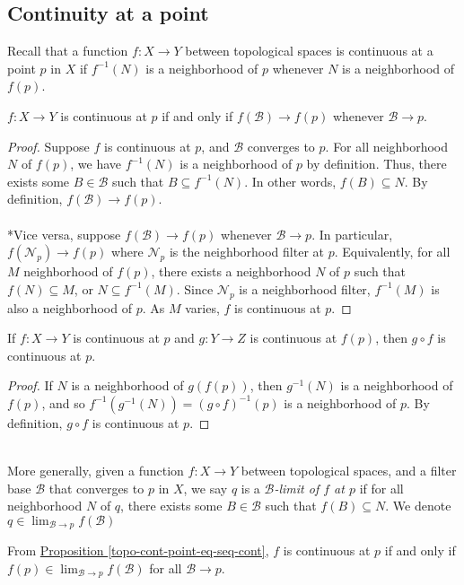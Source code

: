 \documentclass{treatise}
\begin{document}
\subsection{Continuity at a point}
Recall that a function $f: X \to Y$ between topological spaces is continuous at a point $p$ in $X$ if $f^{-1}(N)$ is a neighborhood of $p$ whenever $N$ is a neighborhood of $f(p)$.
\begin{proposition} \label{topo-cont-point-eq-seq-cont}
$f: X \to Y$ is continuous at $p$ if and only if $f(\mathcal{B}) \to f(p)$ whenever $\mathcal{B} \to p$.
\end{proposition}
\begin{proof}
Suppose $f$ is continuous at $p$, and $\mathcal{B}$ converges to $p$. For all neighborhood $N$ of $f(p)$, we have $f^{-1}(N)$ is a neighborhood of $p$ by definition. Thus, there exists some $B \in \mathcal{B}$ such that $B \subseteq f^{-1}(N)$. In other words, $f(B) \subseteq N$. By definition, $f(\mathcal{B}) \to f(p)$.
\\
\\
*Vice versa, suppose $f(\mathcal{B}) \to f(p)$ whenever $\mathcal{B} \to p$. In particular, $f(\mathcal{N}_p) \to f(p)$ where $\mathcal{N}_p$ is the neighborhood filter at $p$. Equivalently, for all $M$ neighborhood of $f(p)$, there exists a neighborhood $N$ of $p$ such that $f(N) \subseteq M$, or $N \subseteq f^{-1}(M)$. Since $\mathcal{N}_p$ is a neighborhood filter, $f^{-1}(M)$ is also a neighborhood of $p$. As $M$ varies, $f$ is continuous at $p$.
\end{proof}
\begin{proposition}
If $f: X \to Y$ is continuous at $p$ and $g: Y \to Z$ is continuous at $f(p)$, then $g \circ f$ is continuous at $p$.
\end{proposition}
\begin{proof}
If $N$ is a neighborhood of $g(f(p))$, then $g^{-1}(N)$ is a neighborhood of $f(p)$, and so $f^{-1}(g^{-1}(N)) = (g \circ f)^{-1}(p)$ is a neighborhood of $p$. By definition, $g \circ f$ is continuous at $p$.
\end{proof}
\ \\
More generally, given a function $f: X \to Y$ between topological spaces, and a filter base $\mathcal{B}$ that converges to $p$ in $X$, we say $q$ is a \emph{$\mathcal{B}$-limit of $f$ at $p$} if for all neighborhood $N$ of $q$, there exists some $B \in \mathcal{B}$ such that $f(B) \subseteq N$. We denote $q \in \lim_{\mathcal{B} \to p} f(\mathcal{B})$
\begin{remark}
From \hyperref[topo-cont-point-eq-seq-cont]{Proposition \ref*{topo-cont-point-eq-seq-cont}}, $f$ is continuous at $p$ if and only if $f(p) \in \lim_{\mathcal{B} \to p} f(\mathcal{B})$ for all $\mathcal{B} \to p$.
\end{remark}
\end{document}

